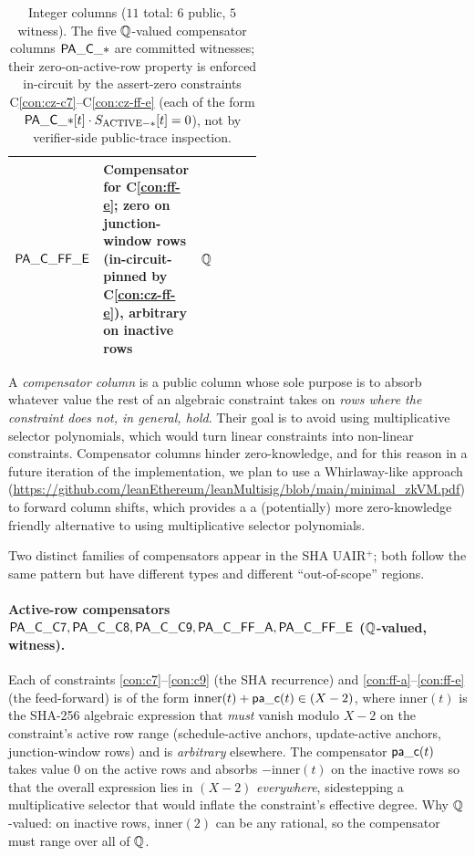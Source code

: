\begin{table}[h]
\begin{tabularx}{\linewidth}{>{\raggedright\arraybackslash}p{0.24\linewidth} >{\raggedright\arraybackslash}X >{\raggedright\arraybackslash}p{0.30\linewidth}}
$\mathsf{PA\_C\_FF\_E}$        & Compensator for C\ref{con:ff-e}; zero on junction-window rows (in-circuit-pinned by C\ref{con:cz-ff-e}), arbitrary on inactive rows & $\mathbb{Q}$ \\
\bottomrule
\end{tabularx}
\caption{Integer columns ($11$ total: $6$ public, $5$ witness). The five $\mathbb{Q}$-valued compensator columns $\mathsf{PA\_C\_*}$ are committed witnesses; their zero-on-active-row property is enforced in-circuit by the assert-zero constraints C\ref{con:cz-c7}--C\ref{con:cz-ff-e} (each of the form $\mathsf{PA\_C\_*}[t] \cdot S_{\mathrm{ACTIVE-*}}[t] = 0$), not by verifier-side public-trace inspection.}
\label{tab:int-cols}
\end{table}


\begin{remark}\label{rem:what-is-comp}
A \emph{compensator column} is a public column whose sole purpose
is to absorb whatever value the rest of an algebraic constraint
takes on \emph{rows where the constraint does not, in general, hold}. Their goal is to avoid using multiplicative selector polynomials, which would turn linear constraints into non-linear constraints. Compensator columns hinder zero-knowledge, and for this reason in a future iteration of the implementation, we plan to use a Whirlaway-like approach (\url{https://github.com/leanEthereum/leanMultisig/blob/main/minimal_zkVM.pdf}) to forward column shifts, which provides a a (potentially) more zero-knowledge friendly alternative to using multiplicative selector polynomials.


Two distinct families of compensators appear in the SHA UAIR$^+$;
both follow the same pattern but have different types and different
``out-of-scope'' regions.

\paragraph{Active-row compensators
$\mathsf{PA\_C\_C7}, \mathsf{PA\_C\_C8}, \mathsf{PA\_C\_C9}, \mathsf{PA\_C\_FF\_A}, \mathsf{PA\_C\_FF\_E}$
($\mathbb{Q}$-valued, witness).}
Each of constraints \ref{con:c7}--\ref{con:c9} (the SHA recurrence)
and \ref{con:ff-a}--\ref{con:ff-e} (the feed-forward) is of the form
$\mathrm{inner}(t) + \mathsf{pa\_c}(t) \in (X-2)$, where
$\mathrm{inner}(t)$ is the SHA-256 algebraic expression that
\emph{must} vanish modulo $X-2$ on the constraint's active row range
(schedule-active anchors, update-active anchors, junction-window rows)
and is \emph{arbitrary} elsewhere. The compensator $\mathsf{pa\_c}(t)$
takes value $0$ on the active rows and absorbs $-\mathrm{inner}(t)$
on the inactive rows so that the overall expression lies in $(X-2)$
\emph{everywhere}, sidestepping a multiplicative selector that would
inflate the constraint's effective degree. Why $\mathbb{Q}$-valued: on
inactive rows, $\mathrm{inner}(2)$ can be any rational, so the
compensator must range over all of $\mathbb{Q}$.


\end{remark}

